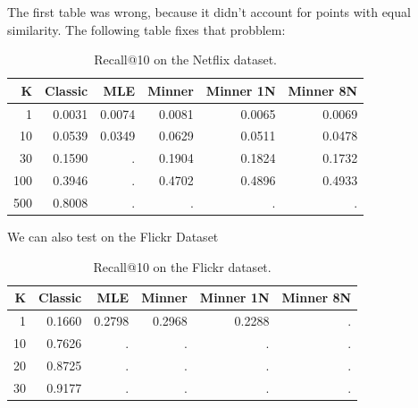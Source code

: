 %

The first table was wrong, because it didn't account for points with equal similarity.
The following table fixes that probblem:
\begin{table}[h!]
\centering
 \begin{tabular}{|r| r r r r r|} 
 \hline
 K  & Classic & MLE & Minner & Minner 1N & Minner 8N \\
 \hline
 1 & 0.0031 & 0.0074 & 0.0081 & 0.0065 & 0.0069 \\
 10 & 0.0539 & 0.0349 & 0.0629 & 0.0511 & 0.0478 \\
 30 & 0.1590 & . & 0.1904  & 0.1824 & 0.1732 \\
 100 & 0.3946 & . & 0.4702 & 0.4896 & 0.4933  \\
 500 & 0.8008 & . & . & . & . \\
  \hline
 \end{tabular}
 \label{tab:flickr}
 \caption{Recall@10 on the Netflix dataset.}
\end{table}

We can also test on the Flickr Dataset
\begin{table}[h!]
\centering
 \begin{tabular}{|r| r r r r r|} 
 \hline
 K  & Classic & MLE & Minner & Minner 1N & Minner 8N \\
 \hline
 1 & 0.1660 & 0.2798 & 0.2968 & 0.2288 & . \\
 10 & 0.7626 & . & . & . & . \\
 20 & 0.8725 & . & . & . & . \\
 30 & 0.9177 & . & . & . & . \\
  \hline
 \end{tabular}
 \label{tab:flickr}
 \caption{Recall@10 on the Flickr dataset.}
\end{table}

